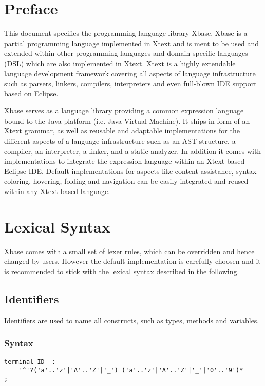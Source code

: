 \documentclass[a4paper,10pt]{scrreprt}
\begin{document}
\chapter{Preface}
\label{Preface}
This document specifies the programming language library Xbase. Xbase is a partial programming language implemented in Xtext and is ment to be used and extended
 within other programming languages and domain-specific languages (DSL) which are also implemented in Xtext. Xtext is a highly extendable language development framework 
covering all aspects of language infrastructure such as parsers, linkers, compilers, interpreters and even full-blown IDE support based on Eclipse. 

Xbase serves as a language library providing a common expression language bound to the Java platform (i.e. Java Virtual Machine). It ships in form of an Xtext grammar, as well as 
reusable and adaptable implementations for the different aspects of a language infrastructure such as an AST structure, a compiler, an interpreter, a linker,  and  a static analyzer.
In addition it comes with implementations to integrate the expression language within an Xtext-based Eclipse IDE. Default implementations for aspects like content assistance, syntax coloring, 
hovering, folding and navigation can be easily integrated and reused within any Xtext based language. 



\chapter{Lexical Syntax}

Xbase comes with a small set of lexer rules, which can be overridden and hence changed by users. However the default implementation is carefully choosen and it is recommended to stick 
with the lexical syntax described in the following.

\section{Identifiers}
\label{Identifiers}
Identifiers are used to name all constructs, such as types, methods and variables.

\subsection{Syntax}

\begin{lstlisting}
terminal ID  : 
	'^'?('a'..'z'|'A'..'Z'|'_') ('a'..'z'|'A'..'Z'|'_'|'0'..'9')*
;

\end{lstlisting}
\end{document}
